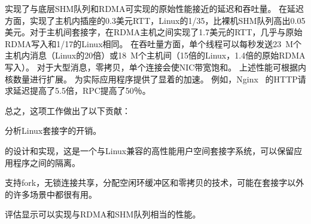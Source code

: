 
\sys {}实现了与底层SHM队列和RDMA可实现的原始性能接近的延迟和吞吐量。
在延迟方面，\sys {}实现了主机内插座的0.3美元RTT，Linux的1/35，比裸机SHM队列高出0.05美元。对于主机间套接字，\sys {}在RDMA主机之间实现了1.7美元的RTT，几乎与原始RDMA写入和1/17的Linux相同。
在吞吐量方面，单个线程可以每秒发送23~M个主机内消息（Linux的20倍）或18~M个主机间（15倍的Linux，1.4倍的原始RDMA写入）。
对于大型消息，零拷贝，单个连接会使NIC带宽饱和。
上述性能可根据内核数量进行扩展。
\sys {}为实际应用程序提供了显着的加速。
例如，Nginx~ \cite {nginx}的HTTP请求延迟提高了5.5倍，RPC提高了50％。

总之，这项工作做出了以下贡献：
\begin{ecompact}
\item 分析Linux套接字的开销。
\item \sys {}的设计和实现，这是一个与Linux兼容的高性能用户空间套接字系统，可以保留应用程序之间的隔离。
\item 支持fork，无锁连接共享，分配空闲环缓冲区和零拷贝的技术，可能在套接字以外的许多场景中都很有用。
\item 评估显示\sys {}可以实现与RDMA和SHM队列相当的性能。
\end{ecompact}


